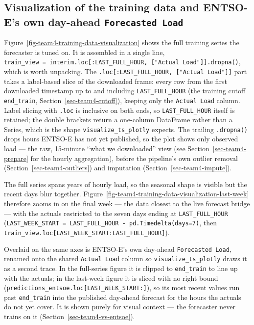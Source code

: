 \documentclass[
  english,
  letterpaper,
]{scrbook}
\begin{document}
\subsection{\texorpdfstring{Visualization of the training data and
ENTSO-E's own day-ahead
\texttt{Forecasted\ Load}}{Visualization of the training data and ENTSO-E's own day-ahead Forecasted Load}}\label{visualization-of-the-training-data-and-entso-es-own-day-ahead-forecasted-load}

Figure~\ref{fig-team4-training-data-visualization} shows the full
training series the forecaster is tuned on. It is assembled in a single
line,
\texttt{train\_view\ =\ interim.loc{[}:LAST\_FULL\_HOUR,\ {[}"Actual\ Load"{]}{]}.dropna()},
which is worth unpacking. The
\texttt{.loc{[}:LAST\_FULL\_HOUR,\ {[}"Actual\ Load"{]}{]}} part takes a
label-based slice of the downloaded frame: every row from the first
downloaded timestamp up to and including \texttt{LAST\_FULL\_HOUR} (the
training cutoff \texttt{end\_train}, Section~\ref{sec-team4-cutoff}),
keeping only the \texttt{Actual\ Load} column. Label slicing with
\texttt{.loc} is inclusive on both ends, so \texttt{LAST\_FULL\_HOUR}
itself is retained; the double brackets return a one-column DataFrame
rather than a Series, which is the shape \texttt{visualize\_ts\_plotly}
expects. The trailing \texttt{.dropna()} drops hours ENTSO-E has not yet
published, so the plot shows only observed load --- the raw, 15-minute
``what we downloaded'' view (see Section~\ref{sec-team4-prepare} for the
hourly aggregation), before the pipeline's own outlier removal
(Section~\ref{sec-team4-outliers}) and imputation
(Section~\ref{sec-team4-impute}).

The full series spans years of hourly load, so the seasonal shape is
visible but the recent days blur together.
Figure~\ref{fig-team4-training-data-visualization-last-week} therefore
zooms in on the final week --- the data closest to the live forecast
bridge --- with the actuals restricted to the seven days ending at
\texttt{LAST\_FULL\_HOUR}
(\texttt{LAST\_WEEK\_START\ =\ LAST\_FULL\_HOUR\ -\ pd.Timedelta(days=7)},
then \texttt{train\_view.loc{[}LAST\_WEEK\_START:LAST\_FULL\_HOUR{]}}).

Overlaid on the same axes is ENTSO-E's own day-ahead
\texttt{Forecasted\ Load}, renamed onto the shared \texttt{Actual\ Load}
column so \texttt{visualize\_ts\_plotly} draws it as a second trace. In
the full-series figure it is clipped to \texttt{end\_train} to line up
with the actuals; in the last-week figure it is sliced with no right
bound (\texttt{predictions\_entsoe.loc{[}LAST\_WEEK\_START:{]}}), so its
most recent values run past \texttt{end\_train} into the published
day-ahead forecast for the hours the actuals do not yet cover. It is
shown purely for visual context --- the forecaster never trains on it
(Section~\ref{sec-team4-vs-entsoe}).
\end{document}

